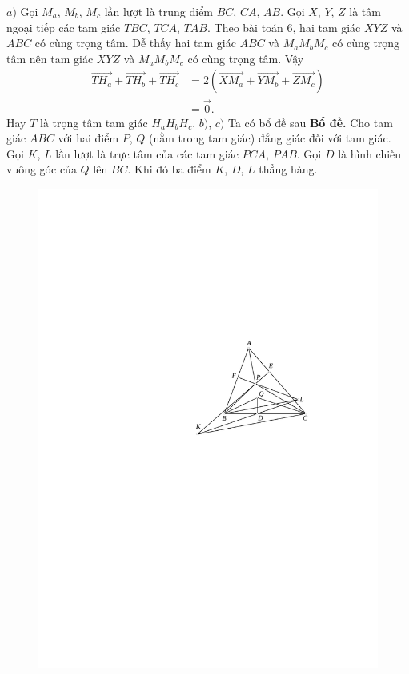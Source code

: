 \begin{multicols}{2}
\begin{figure}[H]
		\vspace*{-5pt}
	\end{figure}
	$a)$ Gọi $M_a$, $M_b$, $M_c$ lần lượt là trung điểm  $BC$, $CA$, $AB$. Gọi $X$, $Y$, $Z$ là tâm ngoại tiếp các tam giác $TBC$, $TCA$, $TAB$. Theo bài toán $6$, hai tam giác $XYZ$ và $ABC$ có cùng trọng tâm. Dễ thấy hai tam giác $ABC$ và $M_aM_bM_c$ có cùng trọng tâm nên tam giác $XYZ$ và $M_aM_bM_c$ có cùng trọng tâm. Vậy
	\begin{align*}
		\overrightarrow{TH_a}\!+\!\overrightarrow{TH_b}\!+\!\overrightarrow{TH_c}
		&=\!2\left(\overrightarrow{XM_a}\!+\!\overrightarrow{YM_b}\!+\!\overrightarrow{ZM_c}\right)\\
		&=\!\overrightarrow{0}.
	\end{align*}
	Hay $T$ là trọng tâm tam giác $H_aH_bH_c$.
	\vskip 0.1cm	
	$b)$, $c)$ Ta có bổ đề sau
	\vskip 0.1cm
	{\bf\color{cackithi} Bổ đề.} Cho tam giác $ABC$ với hai điểm $P$, $Q$ (nằm trong tam giác) đẳng giác đối với tam giác. Gọi $K$, $L$ lần lượt là trực tâm của các tam giác $PCA$, $PAB$. Gọi $D$ là hình chiếu vuông góc của $Q$ lên $BC$. Khi đó ba điểm $K$, $D$, $L$ thẳng hàng.
	\begin{figure}[H]
		\vspace*{-5pt}
		\centering
		\captionsetup{labelformat= empty, justification=centering}
		\includegraphics[width= 0.9\linewidth]{figure3526a}

\end{figure}
\end{multicols}
